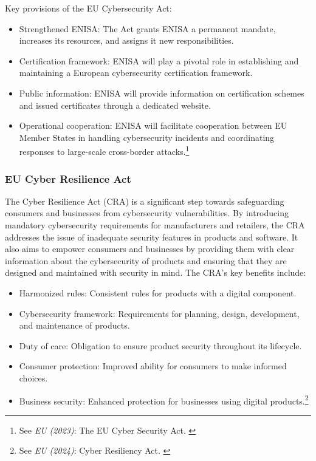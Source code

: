 Key provisions of the EU Cybersecurity Act:

\begin{itemize}
    \item Strengthened ENISA: The Act grants ENISA a permanent mandate, increases its resources, and assigns it new responsibilities.
    \item Certification framework: ENISA will play a pivotal role in establishing and maintaining a European cybersecurity certification framework.
    \item Public information: ENISA will provide information on certification schemes and issued certificates through a dedicated website.
    \item Operational cooperation: ENISA will facilitate cooperation between EU Member States in handling cybersecurity incidents and coordinating responses to large-scale cross-border attacks.\footnote{See \textit{EU (2023)}: The EU Cyber Security Act. \cite{cyberSec}}
\end{itemize}

\subsubsection{EU Cyber Resilience Act}

The Cyber Resilience Act (CRA) is a significant step towards safeguarding consumers and businesses from cybersecurity vulnerabilities. By introducing mandatory cybersecurity requirements for manufacturers and retailers, the CRA addresses the issue of inadequate security features in products and software. It also aims to empower consumers and businesses by providing them with clear information about the cybersecurity of products and ensuring that they are designed and maintained with security in mind. The CRA's key benefits include:

\begin{itemize}
    \item Harmonized rules: Consistent rules for products with a digital component.
    \item Cybersecurity framework: Requirements for planning, design, development, and maintenance of products.
    \item Duty of care: Obligation to ensure product security throughout its lifecycle.
    \item Consumer protection: Improved ability for consumers to make informed choices.
    \item Business security: Enhanced protection for businesses using digital products.\footnote{See \textit{EU (2024)}: Cyber Resiliency Act. \cite{cyberResiliency}}
\end{itemize}

